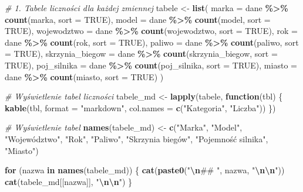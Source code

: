 \documentclass[
]{article}
\newenvironment{Shaded}{\begin{snugshade}}{\end{snugshade}}
\newcommand{\AttributeTok}[1]{\textcolor[rgb]{0.13,0.29,0.53}{#1}}
\newcommand{\CommentTok}[1]{\textcolor[rgb]{0.56,0.35,0.01}{\textit{#1}}}
\newcommand{\ConstantTok}[1]{\textcolor[rgb]{0.56,0.35,0.01}{#1}}
\newcommand{\ControlFlowTok}[1]{\textcolor[rgb]{0.13,0.29,0.53}{\textbf{#1}}}
\newcommand{\FunctionTok}[1]{\textcolor[rgb]{0.13,0.29,0.53}{\textbf{#1}}}
\newcommand{\NormalTok}[1]{#1}
\newcommand{\OtherTok}[1]{\textcolor[rgb]{0.56,0.35,0.01}{#1}}
\newcommand{\SpecialCharTok}[1]{\textcolor[rgb]{0.81,0.36,0.00}{\textbf{#1}}}
\newcommand{\StringTok}[1]{\textcolor[rgb]{0.31,0.60,0.02}{#1}}
\begin{document}
\begin{Shaded}
\begin{Highlighting}[]
\CommentTok{\# 1. Tabele liczności dla każdej zmiennej}
\NormalTok{tabele }\OtherTok{\textless{}{-}} \FunctionTok{list}\NormalTok{(}
  \AttributeTok{marka =}\NormalTok{ dane }\SpecialCharTok{\%\textgreater{}\%} \FunctionTok{count}\NormalTok{(marka, }\AttributeTok{sort =} \ConstantTok{TRUE}\NormalTok{),}
  \AttributeTok{model =}\NormalTok{ dane }\SpecialCharTok{\%\textgreater{}\%} \FunctionTok{count}\NormalTok{(model, }\AttributeTok{sort =} \ConstantTok{TRUE}\NormalTok{),}
  \AttributeTok{wojewodztwo =}\NormalTok{ dane }\SpecialCharTok{\%\textgreater{}\%} \FunctionTok{count}\NormalTok{(wojewodztwo, }\AttributeTok{sort =} \ConstantTok{TRUE}\NormalTok{),}
  \AttributeTok{rok =}\NormalTok{ dane }\SpecialCharTok{\%\textgreater{}\%} \FunctionTok{count}\NormalTok{(rok, }\AttributeTok{sort =} \ConstantTok{TRUE}\NormalTok{),}
  \AttributeTok{paliwo =}\NormalTok{ dane }\SpecialCharTok{\%\textgreater{}\%} \FunctionTok{count}\NormalTok{(paliwo, }\AttributeTok{sort =} \ConstantTok{TRUE}\NormalTok{),}
  \AttributeTok{skrzynia\_biegow =}\NormalTok{ dane }\SpecialCharTok{\%\textgreater{}\%} \FunctionTok{count}\NormalTok{(skrzynia\_biegow, }\AttributeTok{sort =} \ConstantTok{TRUE}\NormalTok{),}
  \AttributeTok{poj\_silnika =}\NormalTok{ dane }\SpecialCharTok{\%\textgreater{}\%} \FunctionTok{count}\NormalTok{(poj\_silnika, }\AttributeTok{sort =} \ConstantTok{TRUE}\NormalTok{),}
  \AttributeTok{miasto =}\NormalTok{  dane }\SpecialCharTok{\%\textgreater{}\%} \FunctionTok{count}\NormalTok{(miasto, }\AttributeTok{sort =} \ConstantTok{TRUE}\NormalTok{)}
\NormalTok{)}

\CommentTok{\# Wyświetlenie tabel liczności}
\NormalTok{tabele\_md }\OtherTok{\textless{}{-}} \FunctionTok{lapply}\NormalTok{(tabele, }\ControlFlowTok{function}\NormalTok{(tbl) \{}
  \FunctionTok{kable}\NormalTok{(tbl, }\AttributeTok{format =} \StringTok{"markdown"}\NormalTok{, }\AttributeTok{col.names =} \FunctionTok{c}\NormalTok{(}\StringTok{"Kategoria"}\NormalTok{, }\StringTok{"Liczba"}\NormalTok{))}
\NormalTok{\})}

\CommentTok{\# Wyświetlenie tabel}
\FunctionTok{names}\NormalTok{(tabele\_md) }\OtherTok{\textless{}{-}} \FunctionTok{c}\NormalTok{(}\StringTok{"Marka"}\NormalTok{, }\StringTok{"Model"}\NormalTok{, }\StringTok{"Województwo"}\NormalTok{, }\StringTok{"Rok"}\NormalTok{, }\StringTok{"Paliwo"}\NormalTok{, }\StringTok{"Skrzynia biegów"}\NormalTok{, }\StringTok{"Pojemność silnika"}\NormalTok{, }\StringTok{"Miasto"}\NormalTok{)}

\ControlFlowTok{for}\NormalTok{ (nazwa }\ControlFlowTok{in} \FunctionTok{names}\NormalTok{(tabele\_md)) \{}
  \FunctionTok{cat}\NormalTok{(}\FunctionTok{paste0}\NormalTok{(}\StringTok{"}\SpecialCharTok{\textbackslash{}n}\StringTok{\#\# "}\NormalTok{, nazwa, }\StringTok{"}\SpecialCharTok{\textbackslash{}n\textbackslash{}n}\StringTok{"}\NormalTok{)) }
  \FunctionTok{cat}\NormalTok{(tabele\_md[[nazwa]], }\StringTok{"}\SpecialCharTok{\textbackslash{}n\textbackslash{}n}\StringTok{"}\NormalTok{)   }
\NormalTok{\}}
\end{Highlighting}
\end{Shaded}
\end{document}
